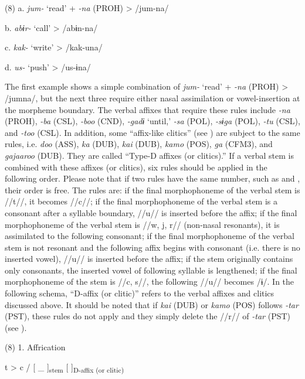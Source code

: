 (8)  a.  \textit{jum-}  ‘read’  +  \textit{{}-na} (PROH)  >  /jum-na/

  b.  \textit{abɨr-}  ‘call’        >  /abɨn-na/

  c.  \textit{kak-}  ‘write’        >  /kak-una/

  d.  \textit{us-}  ‘push’        >  /us-ɨna/

The first example shows a simple combination of \textit{jum-} ‘read’ + \textit{{}-na} (PROH) > /jumna/, but the next three require either nasal assimilation or vowel-insertion at the morpheme boundary. The verbal affixes that require these rules include \textit{{}-na} (PROH), \textit{{}-ba} (CSL), \textit{{}-boo} (CND), \textit{{}-gadɨ} ‘until,’ \textit{{}-sa} (POL), \textit{{}-sɨga} (POL), \textit{{}-tu} (CSL), and \textit{{}-too} (CSL). In addition, some “affix-like clitics” (see ) are subject to the same rules, i.e. \textit{doo} (ASS), \textit{ka} (DUB), \textit{kai} (DUB), \textit{kamo} (POS), \textit{ga} (CFM3), and \textit{gajaaroo} (DUB). They are called “Type-D affixes (or clitics).” If a verbal stem is combined with these affixes (or clitics), six rules should be applied in the following order. Please note that if two rules have the same number, such as  and , their order is free. The rules are:  if the final morphophoneme of the verbal stem is //t//, it becomes //c//;  if the final morphophoneme of the verbal stem is a consonant after a syllable boundary, //u// is inserted before the affix;  if the final morphophoneme of the verbal stem is //w, j, r// (non-nasal resonants), it is assimilated to the following consonant;  if the final morphophoneme of the verbal stem is not resonant and the following affix begins with consonant (i.e. there is no inserted vowel), //u// is inserted before the affix;  if the stem originally contains only consonants, the inserted vowel of following syllable is lengthened;  if the final morphophoneme of the stem is //c, s//, the following //u// becomes /ɨ/. In the following schema, “D-affix (or clitic)” refers to the verbal affixes and clitics discussed above. It should be noted that if \textit{kai} (DUB) or \textit{kamo} (POS) follows \textit{{}-tar} (PST), these rules do not apply and they simply delete the //r// of \textit{{}-tar} (PST) (see ).

(8)  1.  Affrication

    t  >  c  /  [    \_ ]\textsubscript{stem}  [  ]\textsubscript{D-affix (or clitic)}


